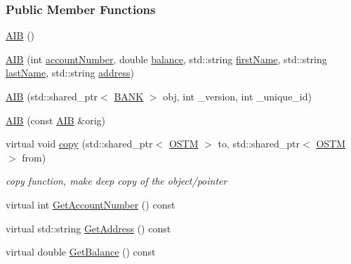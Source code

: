 \subsubsection*{Public Member Functions}
\begin{DoxyCompactItemize}
\item 
\hyperlink{class_a_i_b_a4783110463bf12f937a85b62455faf38_a4783110463bf12f937a85b62455faf38}{A\+IB} ()
\item 
\hyperlink{class_a_i_b_a5fe3963becf294f6b1ce1a747f9122a0_a5fe3963becf294f6b1ce1a747f9122a0}{A\+IB} (int \hyperlink{class_a_i_b_aafc08efeec5b8c800c32ee32f20603a7_aafc08efeec5b8c800c32ee32f20603a7}{account\+Number}, double \hyperlink{class_a_i_b_a3c8d637bd997c1f062d844a88e2559ba_a3c8d637bd997c1f062d844a88e2559ba}{balance}, std\+::string \hyperlink{class_a_i_b_a869f72057cb63ebf0cfd257069e15c7c_a869f72057cb63ebf0cfd257069e15c7c}{first\+Name}, std\+::string \hyperlink{class_a_i_b_ace7b8b648d1b44b7ee2f4be002952b7a_ace7b8b648d1b44b7ee2f4be002952b7a}{last\+Name}, std\+::string \hyperlink{class_a_i_b_ae6a67cc33d1e5fa83a52a238e45ca3dc_ae6a67cc33d1e5fa83a52a238e45ca3dc}{address})
\item 
\hyperlink{class_a_i_b_aa0faccb7aadf423d12bddb2469ff5053_aa0faccb7aadf423d12bddb2469ff5053}{A\+IB} (std\+::shared\+\_\+ptr$<$ \hyperlink{class_b_a_n_k}{B\+A\+NK} $>$ obj, int \+\_\+version, int \+\_\+unique\+\_\+id)
\item 
\hyperlink{class_a_i_b_ab13d0db3498d59dbe6a946c469587c55_ab13d0db3498d59dbe6a946c469587c55}{A\+IB} (const \hyperlink{class_a_i_b}{A\+IB} \&orig)
\item 
virtual void \hyperlink{class_a_i_b_ad76f25ce86cb42028440f41c371903e0_ad76f25ce86cb42028440f41c371903e0}{copy} (std\+::shared\+\_\+ptr$<$ \hyperlink{class_o_s_t_m}{O\+S\+TM} $>$ to, std\+::shared\+\_\+ptr$<$ \hyperlink{class_o_s_t_m}{O\+S\+TM} $>$ from)
\begin{DoxyCompactList}\small\item\em copy function, make deep copy of the object/pointer \end{DoxyCompactList}\item 
virtual int \hyperlink{class_a_i_b_aef34bfbf20d767114e05b8b532cab777_aef34bfbf20d767114e05b8b532cab777}{Get\+Account\+Number} () const 
\item 
virtual std\+::string \hyperlink{class_a_i_b_a5092c8741fbe231531aa5aaa61d26b9c_a5092c8741fbe231531aa5aaa61d26b9c}{Get\+Address} () const 
\item 
virtual double \hyperlink{class_a_i_b_ac75087ae73c308bd946e47a71dc85b86_ac75087ae73c308bd946e47a71dc85b86}{Get\+Balance} () const 

\end{DoxyCompactItemize}
